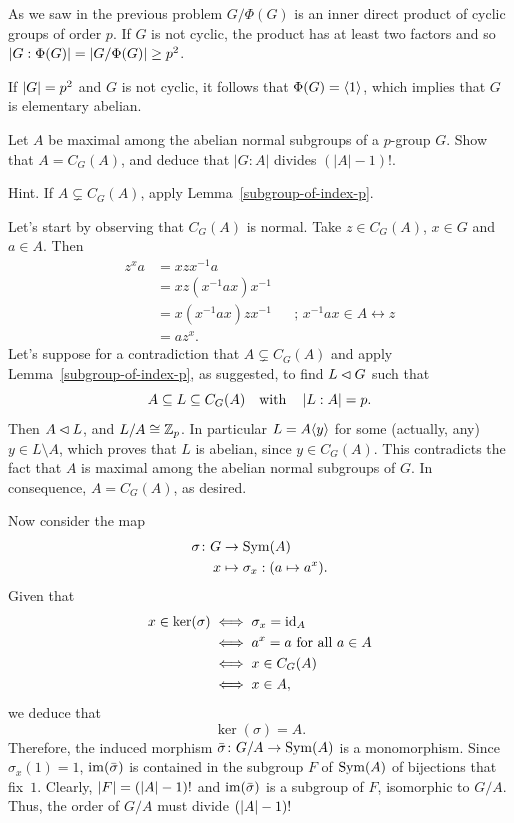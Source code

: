 \begin{solution} As we saw in the previous problem $G/\Phi(G)$ is an inner direct product of cyclic groups of order $p$. If $G$ is not cyclic, the product has at least two factors and so $\left\vert{G:\Phi(G)}\right\vert=\left\vert{G/\Phi(G)}\right\vert\ge p^2$.

If $\left\vert{G}\right\vert=p^2$ and $G$ is not cyclic, it follows that $\Phi(G)=\langle1\rangle$, which implies that $G$ is elementary abelian.  \end{solution}

\begin{probl}
    Let $A$ be maximal among the abelian normal subgroups of a $p$-group\/ $G$. Show that $A=C_G(A)$, and deduce that $|G : A|$ divides $(|A| - 1)!$.

    \textrm{\upshape Hint. If $A\varsubsetneq C_G(A)$, apply Lemma~\ref{subgroup-of-index-p}.}
\end{probl}

\begin{solution} Let's start by observing that $C_G(A)$ is normal. Take $z\in C_G(A)$, $x\in G$ and $a\in A$. Then
\begin{align*}
     z^xa &= xzx^{-1}a\\
        &=xz(x^{-1}ax)x^{-1}\\
        &= x(x^{-1}ax)zx^{-1} &&\text{; }x^{-1}ax\in A\leftrightarrow z\\
        &= az^x.
\end{align*}
Let's suppose for a contradiction that $A\varsubsetneq C_G(A)$ and apply Lemma~\ref{subgroup-of-index-p}, as suggested, to find $L\lhd G$ such that
$$
    A\subseteq L\subseteq C_G(A)\quad\text{with}\quad \left\vert{L:A}\right\vert=p.
$$
Then $A\lhd L$, and $L/A\cong\mathbb{Z}_p$. In particular $L=A\langle y\rangle$ for some (actually, any) $y\in L\setminus A$, which proves that $L$ is abelian, since $y\in C_G(A)$. This contradicts the fact that $A$ is maximal among the abelian normal subgroups of $G$. In consequence, $A=C_G(A)$, as desired.

Now consider the map
\begin{align*}
    \sigma\colon G&\to{\rm Sym}(A)\\
    x&\mapsto\sigma_x: (a\mapsto a^x).
\end{align*}
Given that
\begin{align*}
    x\in\ker(\sigma) &\iff \sigma_x=\operatorname{id}_A\\
        &\iff a^x=a \text{ for all }a\in A\\
        &\iff x\in C_G(A)\\
        &\iff x\in A,
\end{align*}
we deduce that
$$
    \ker(\sigma) = A.
$$
Therefore, the induced morphism $\bar\sigma\colon G/A\to{\rm Sym}(A)$ is a monomorphism. Since $\sigma_x(1)=1$,
 $\operatorname{im}(\bar\sigma)$ is contained in the subgroup $F$ of ${\rm Sym}(A)$ of bijections that fix~$1$. Clearly, $\left\vert{F}\right\vert=(\left\vert{A}\right\vert-1)!$ and $\operatorname{im}(\bar\sigma)$ is a subgroup of $F$, isomorphic to $G/A$. Thus, the order of $G/A$ must divide $(\left\vert{A}\right\vert-1)!$  \end{solution}


